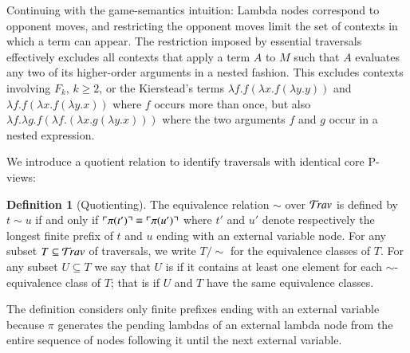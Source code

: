 \documentclass{elsarticle}
\makeatletter
\newif\iflongversion
\theoremstyle{plain}
\newtheorem{property}[theorem]{Property}
\theoremstyle{definition}
\newtheorem{definition}{Definition}[section]
\newcommand\Nodes{\mathcal{N}}%
\newcommand\NodesLmd{\Nodes_\lambda}%
\newcommand{\travulc}{\travset}
\def\coresymbol{\pi} %
\newcommand{\core}[1]{\coresymbol(#1)} %
\newcommand{\ExternalNodes}{\Nodes^{\sf ext}}
\renewcommand\ie{{\it i.e.\@\xspace}}
\makeatother
\begin{document}
Continuing with the game-semantics intuition: Lambda nodes correspond to opponent moves, and restricting the opponent moves limit the set of contexts in which a term can appear. The restriction imposed by essential traversals effectively excludes all contexts that apply a term $A$ to $M$ such that $A$ evaluates any two of its higher-order arguments in a nested fashion. This excludes contexts involving $F_k$, $k\geq 2$, or the Kierstead's terms $\lambda f .f (\lambda x .f (\lambda y.y))$ and $\lambda f .f (\lambda x .f (\lambda y.x))$ where $f$ occurs more than once, but also $\lambda f. \lambda g . f (\lambda f .(\lambda x . g (\lambda y . x)))$ where the two arguments $f$ and $g$ occur in a nested expression.

\iflongversion
\begin{property}
\label{prop:core_truncation_at_externallambda}
Let $t\in\travulc$ be a traversal which does not contain any ghost occurrence, and $m$ be an occurrence in $t$ of an external $\lambda$-node (\ie, $m \in \NodesLmd\inter\ExternalNodes$). Then $\core{t_{<m}} = \core{t}_{<m}$.
\end{property}
\begin{proof}
By an easy induction on $t$ using the fact that in the recursive calculation of $\coresymbol(t)$, external lambda nodes reset the stack of pending lambdas.
\end{proof}
\fi

We introduce a quotient relation to identify traversals with identical core P-views:
\begin{definition}[Quotienting]
The equivalence relation $\sim$ over $\travulc$ is defined by $t \sim u$ if and only if
$\pview{\core{t'}} \equiv \pview{\core{u'}}$
where $t'$ and $u'$ denote respectively the longest finite prefix of $t$ and $u$ ending with an external variable node.
For any subset $T\subseteq \travulc$ of traversals, we write $T/{\sim}$ for the equivalence classes of $T$.
%
For any subset $U\subseteq T$ we say that $U$ is  if it contains at least one element for each $\sim$-equivalence class of $T$; that is if $U$ and $T$ have the same equivalence classes.
\end{definition}
The definition considers only finite prefixes ending with an external variable because $\coresymbol$ generates the pending lambdas of an external lambda node from the entire sequence of nodes following it until the next external variable.
\end{document}
